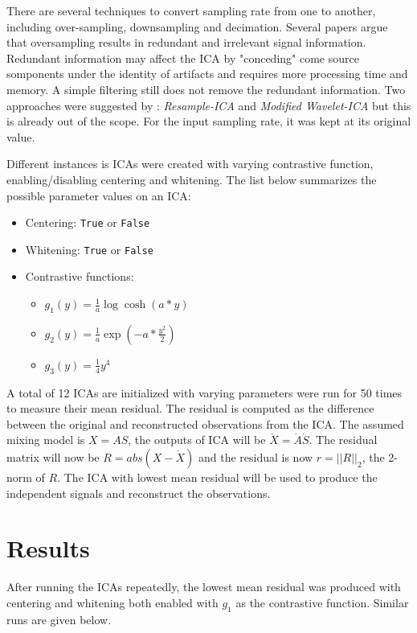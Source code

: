 \documentclass{article}
\begin{document}
There are several techniques to convert sampling rate from one to another, including over-sampling, downsampling and decimation. Several papers argue that oversampling results in redundant and irrelevant signal information. Redundant information may affect the ICA by "conceding" come source somponents under the identity of artifacts and requires more processing time and memory. A simple filtering still does not remove the redundant information. Two approaches were suggested by \cite{bib:sampling}: \textit{Resample-ICA} and \textit{Modified Wavelet-ICA} but this is already out of the scope. For the input sampling rate, it was kept at its original value.

Different instances is ICAs were created with varying contrastive function, enabling/disabling centering and whitening. The list below summarizes the possible parameter values on an ICA:
\begin{itemize}
	\item Centering: \texttt{True} or \texttt{False}
	\item Whitening: \texttt{True} or \texttt{False}
	\item Contrastive functions:
	\begin{itemize}
		\item $g_1(y) = \frac{1}{a} \log \cosh (a * y)$
		\item $g_2(y) = \frac{1}{a} \exp \left( -a * \frac{y^2}{2} \right)$
		\item $g_3(y) = \frac{1}{4} y^4$
	\end{itemize}
\end{itemize}

A total of 12 ICAs are initialized with varying parameters were run for 50 times to measure their mean residual. The residual is computed as the difference between the original and reconstructed observations from the ICA. The assumed mixing model is $X = AS$, the outputs of ICA will be $\dot{X} = \dot{A}\dot{S}$. The residual matrix will now be $R = abs(X - \dot{X})$ and the residual is now $r = ||R||_2$, the 2-norm of $R$. The ICA with lowest mean residual will be used to produce the independent signals and reconstruct the observations.

\section{Results}
After running the ICAs repeatedly, the lowest mean residual was produced with centering and whitening both enabled with $g_1$ as the contrastive function. Similar runs are given below.
\end{document}
